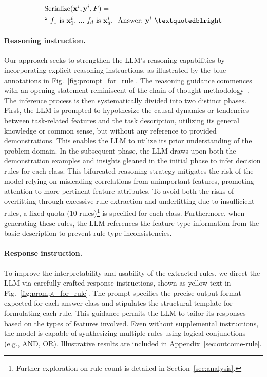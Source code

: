 \begin{align}
&\text{Serialize}(\mathbf{x}^i,\mathbf{y}^i, F) = \nonumber \\ 
&``\ f_1\ \text{is}\ \mathbf{x}^i_1.\ ... \ f_d\  \text{is}\  \mathbf{x}^i_d.\ \ \text{Answer:}\  \mathbf{y}^i\ ”
\end{align}

\vspace*{-0.12in}
\paragraph{Reasoning instruction.} Our approach seeks to strengthen the LLM's reasoning capabilities by incorporating explicit reasoning instructions, as illustrated by the blue annotations in Fig.~\ref{fig:prompt_for_rule}. The reasoning guidance commences with an opening statement reminiscent of the chain-of-thought methodology~\cite{wei2022chain}. The inference process is then systematically divided into two distinct phases. First, the LLM is prompted to hypothesize the causal dynamics or tendencies between task-related features and the task description, utilizing its general knowledge or common sense, but without any reference to provided demonstrations. This enables the LLM to utilize its prior understanding of the problem domain. In the subsequent phase, the LLM draws upon both the demonstration examples and insights gleaned in the initial phase to infer decision rules for each class. This bifurcated reasoning strategy mitigates the risk of the model relying on misleading correlations from unimportant features, promoting attention to more pertinent feature attributes. To avoid both the risks of overfitting through excessive rule extraction and underfitting due to insufficient rules, a fixed quota (10 rules)\footnote{Further exploration on rule count is detailed in Section~\ref{sec:analysis}.} is specified for each class. Furthermore, when generating these rules, the LLM references the feature type information from the basic description to prevent rule type inconsistencies.

\vspace*{-0.12in}
\paragraph{Response instruction.} To improve the interpretability and usability of the extracted rules, we direct the LLM via carefully crafted response instructions, shown as yellow text in Fig.~\ref{fig:prompt_for_rule}. The prompt specifies the precise output format expected for each answer class and stipulates the structural template for formulating each rule. This guidance permits the LLM to tailor its responses based on the types of features involved. Even without supplemental instructions, the model is capable of synthesizing multiple rules using logical conjunctions (e.g., AND, OR). Illustrative results are included in Appendix~\ref{sec:outcome-rule}.

